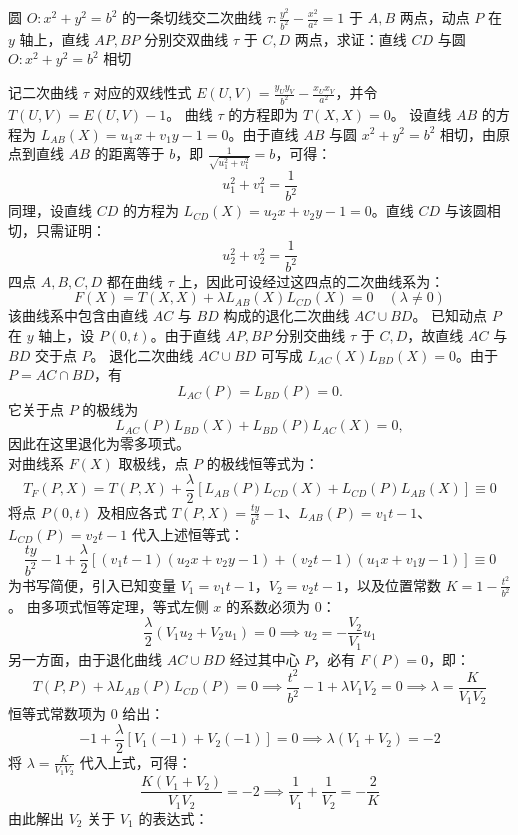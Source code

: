 \begin{example}
圆 $O: x^2 + y^2 = b^2$ 的一条切线交二次曲线 $\tau: \frac{y^2}{b^2}-\frac{x^2}{a^2} = 1$ 于 $A,B$ 两点，动点 $P$ 在 $y$ 轴上，直线 $AP,BP$ 分别交双曲线 $\tau$ 于 $C,D$ 两点，求证：直线 $CD$ 与圆 $O: x^2 + y^2 = b^2$ 相切
\end{example}
\begin{solution}
记二次曲线 $\tau$ 对应的双线性式 $E(U,V) = \frac{y_U y_V}{b^2} - \frac{x_U x_V}{a^2}$，并令 $T(U,V) = E(U,V) - 1$。
曲线 $\tau$ 的方程即为 $T(X,X) = 0$。
设直线 $AB$ 的方程为 $L_{AB}(X) = u_1 x + v_1 y - 1 = 0$。由于直线 $AB$ 与圆 $x^2 + y^2 = b^2$ 相切，由原点到直线 $AB$ 的距离等于 $b$，即 $\frac{1}{\sqrt{u_1^2 + v_1^2}} = b$，可得：
$$u_1^2 + v_1^2 = \frac{1}{b^2}$$
同理，设直线 $CD$ 的方程为 $L_{CD}(X) = u_2 x + v_2 y - 1 = 0$。直线 $CD$ 与该圆相切，只需证明：
$$u_2^2 + v_2^2 = \frac{1}{b^2}$$
四点 $A,B,C,D$ 都在曲线 $\tau$ 上，因此可设经过这四点的二次曲线系为：
$$F(X) = T(X,X) + \lambda L_{AB}(X) L_{CD}(X) = 0 \quad (\lambda \neq 0)$$
该曲线系中包含由直线 $AC$ 与 $BD$ 构成的退化二次曲线 $AC \cup BD$。
已知动点 $P$ 在 $y$ 轴上，设 $P(0, t)$。由于直线 $AP, BP$ 分别交曲线 $\tau$ 于 $C, D$，故直线 $AC$ 与 $BD$ 交于点 $P$。
退化二次曲线 $AC\cup BD$ 可写成 $L_{AC}(X)L_{BD}(X)=0$。由于 $P=AC\cap BD$，有
\[
L_{AC}(P)=L_{BD}(P)=0.
\]
它关于点 $P$ 的极线为
\[
L_{AC}(P)L_{BD}(X)+L_{BD}(P)L_{AC}(X)=0,
\]
因此在这里退化为零多项式。\\
对曲线系 $F(X)$ 取极线，点 $P$ 的极线恒等式为：
$$T_F(P,X) = T(P,X) + \frac{\lambda}{2} \left[ L_{AB}(P) L_{CD}(X) + L_{CD}(P) L_{AB}(X) \right] \equiv 0$$
将点 $P(0,t)$ 及相应各式 $T(P,X) = \frac{t y}{b^2} - 1$、$L_{AB}(P) = v_1 t - 1$、$L_{CD}(P) = v_2 t - 1$ 代入上述恒等式：
$$\frac{t y}{b^2} - 1 + \frac{\lambda}{2} \left[ (v_1 t - 1)(u_2 x + v_2 y - 1) + (v_2 t - 1)(u_1 x + v_1 y - 1) \right] \equiv 0$$
为书写简便，引入已知变量 $V_1 = v_1 t - 1$，$V_2 = v_2 t - 1$，以及位置常数 $K = 1 - \frac{t^2}{b^2}$。
由多项式恒等定理，等式左侧 $x$ 的系数必须为 $0$：
$$\frac{\lambda}{2} (V_1 u_2 + V_2 u_1) = 0 \implies u_2 = -\frac{V_2}{V_1} u_1$$
另一方面，由于退化曲线 $AC \cup BD$ 经过其中心 $P$，必有 $F(P) = 0$，即：
$$T(P,P) + \lambda L_{AB}(P) L_{CD}(P) = 0 \implies \frac{t^2}{b^2} - 1 + \lambda V_1 V_2 = 0 \implies \lambda = \frac{K}{V_1 V_2}$$
恒等式常数项为 $0$ 给出：
$$-1 + \frac{\lambda}{2} [ V_1(-1) + V_2(-1) ] = 0 \implies \lambda(V_1 + V_2) = -2$$
将 $\lambda = \frac{K}{V_1 V_2}$ 代入上式，可得：
$$\frac{K(V_1 + V_2)}{V_1 V_2} = -2 \implies \frac{1}{V_1} + \frac{1}{V_2} = -\frac{2}{K}$$
由此解出 $V_2$ 关于 $V_1$ 的表达式：

\end{solution}
